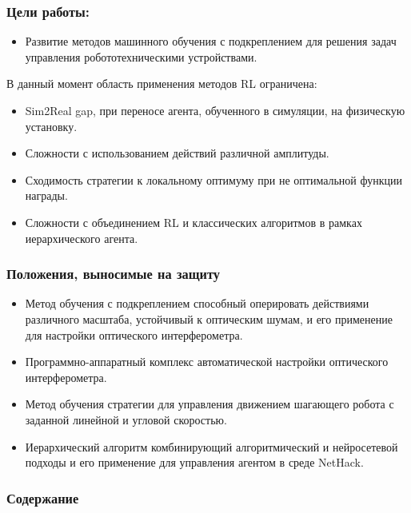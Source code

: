 \begin{frame}
    \setcounter{framenumber}{1}
    \maketitle
\end{frame}

\begin{frame}
    \frametitle{Цели работы:}
    \begin{itemize}
        \item Развитие методов машинного обучения с подкреплением для решения задач управления робототехническими устройствами.
    \end{itemize}

    \vspace{20pt}
    В данный момент область применения методов RL ограничена:
    \begin{itemize}
        \item Sim2Real gap, при переносе агента, обученного в симуляции, на физическую установку.
        \item Сложности с использованием действий различной амплитуды.
        \item Сходимость стратегии к локальному  оптимуму при не оптимальной функции награды.
       \item Сложности с объединением RL и классических алгоритмов в рамках иерархического агента.
    \end{itemize}
\end{frame}

\begin{frame}
    \frametitle{Положения, выносимые на защиту}
    \begin{itemize}
        \item Метод обучения с подкреплением способный оперировать действиями различного масштаба, устойчивый к оптическим шумам, и его применение для настройки оптического интерферометра.
        \item Программно-аппаратный комплекс автоматической настройки оптического интерферометра.
        \item Метод обучения стратегии для управления движением шагающего робота с заданной линейной и угловой скоростью.
        \item Иерархический алгоритм комбинирующий алгоритмический и нейросетевой подходы и его применение для управления агентом в среде NetHack.
    \end{itemize}
\end{frame}

\begin{frame}
    \frametitle{Содержание}
    \tableofcontents
\end{frame}
